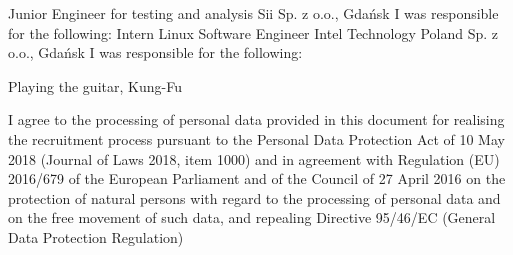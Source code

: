 \documentclass{cvClass}
\begin{document}
    {
      \experience
        {Junior Engineer for testing and analysis}
        {Sii Sp. z o.o., Gdańsk}
        {I was responsible for the following:}
        {
        }
    }
  \intervalSection
    {}
    {
      \experience
        {Intern Linux Software Engineer}
        {Intel Technology Poland Sp. z o.o., Gdańsk}
        {I was responsible for the following:} {
        }
    }
  
    {Playing the guitar, Kung-Fu}

  \vfill
    {I agree to the processing of personal data provided in this document for realising the recruitment process pursuant to the Personal Data Protection Act of 10 May 2018 (Journal of Laws 2018, item 1000) and in agreement with Regulation (EU) 2016/679 of the European Parliament and of the Council of 27 April 2016 on the protection of natural persons with regard to the processing of personal data and on the free movement of such data, and repealing Directive 95/46/EC (General Data Protection Regulation)}
\end{document}
